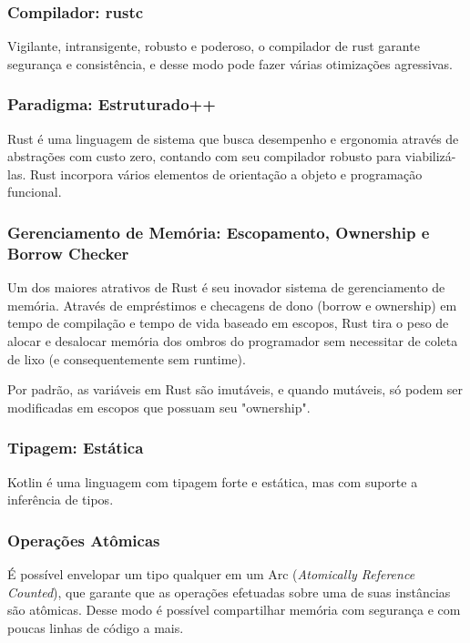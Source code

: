\documentclass[12pt,a4paper]{article}
\begin{document}
\subsubsection{Compilador: rustc}
\label{sssec:rust compilador}

Vigilante, intransigente, robusto e poderoso, o compilador de rust garante segurança e consistência, e desse modo pode fazer várias otimizações agressivas.

\subsubsection{Paradigma: Estruturado++}
\label{sssec:rust paradigma}

Rust é uma linguagem de sistema que busca desempenho e ergonomia através de abstrações com custo zero, contando com seu compilador robusto para viabilizá-las. Rust incorpora vários elementos de orientação a objeto e programação funcional.

\subsubsection{Gerenciamento de Memória: Escopamento, Ownership e Borrow Checker}
\label{sssec:rust memoria}

Um dos maiores atrativos de Rust é seu inovador sistema de gerenciamento de memória. Através de empréstimos e checagens de dono (borrow e ownership) em tempo de compilação e tempo de vida baseado em escopos, Rust tira o peso de alocar e desalocar memória dos ombros do programador sem necessitar de coleta de lixo (e consequentemente sem runtime).

Por padrão, as variáveis em Rust são imutáveis, e quando mutáveis, só podem ser modificadas em escopos que possuam seu "ownership".

\subsubsection{Tipagem: Estática}
\label{sssec:rust tipagem}

Kotlin é uma linguagem com tipagem forte e estática, mas com suporte a inferência de tipos.

\subsubsection{Operações Atômicas}
\label{sssec:rust operacoes atomicas}

É possível envelopar um tipo qualquer em um Arc (\emph{Atomically Reference Counted}), que garante que as operações efetuadas sobre uma de suas instâncias são atômicas. Desse modo é possível compartilhar memória com segurança e com poucas linhas de código a mais.
\end{document}
